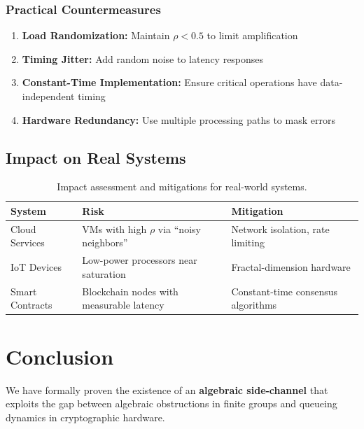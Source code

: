 \documentclass[11pt]{article}
\begin{document}
\subsubsection{Practical Countermeasures}

\begin{enumerate}
    \item \textbf{Load Randomization:} Maintain $\rho < 0.5$ to limit amplification
    \item \textbf{Timing Jitter:} Add random noise to latency responses
    \item \textbf{Constant-Time Implementation:} Ensure critical operations have data-independent timing
    \item \textbf{Hardware Redundancy:} Use multiple processing paths to mask errors
\end{enumerate}

\subsection{Impact on Real Systems}

\begin{table}[h]
\centering
\caption{Impact assessment and mitigations for real-world systems.}
\label{tab:impact}
\begin{tabular}{@{}p{3cm}p{5cm}p{5cm}@{}}
\toprule
\textbf{System} & \textbf{Risk} & \textbf{Mitigation} \\
\midrule
Cloud Services & VMs with high $\rho$ via ``noisy neighbors'' & Network isolation, rate limiting \\
IoT Devices & Low-power processors near saturation & Fractal-dimension hardware \\
Smart Contracts & Blockchain nodes with measurable latency & Constant-time consensus algorithms \\
\bottomrule
\end{tabular}
\end{table}

\section{Conclusion}
\label{sec:conclusion}

We have formally proven the existence of an \textbf{algebraic side-channel} that exploits the gap between algebraic obstructions in finite groups and queueing dynamics in cryptographic hardware.
\end{document}
